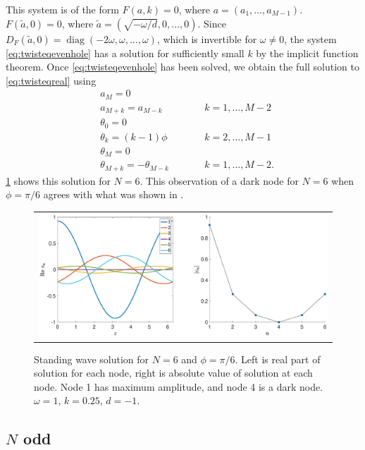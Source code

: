 \documentclass[12pt]{article}
\DeclareMathOperator{\diag}{diag}
\begin{document}
This system is of the form $F(a,k) = 0$, where $a = (a_1, \dots, a_{M-1})$. $F(\tilde{a}, 0) = 0$, where $\tilde{a} = (\sqrt{-\omega/d}, 0, \dots, 0)$. Since $D_F(\tilde{a}, 0) = \diag(-2\omega,\omega, \dots, \omega)$, which is invertible for $\omega \neq 0$, the system \cref{eq:twisteqevenhole} has a solution for sufficiently small $k$ by the implicit function theorem. Once \cref{eq:twisteqevenhole} has been solved, we obtain the full solution to \cref{eq:twisteqreal} using
\begin{align*}
&a_M = 0 \\
&a_{M+k} = a_{M-k} && \qquad k = 1, \dots, M-2 \\
&\theta_0 = 0 \\
&\theta_k = (k-1)\phi && \qquad  k = 2, \dots, M-1 \\
&\theta_M = 0 \\
&\theta_{M+k} = -\theta_{M-k} && \qquad k = 1, \dots, M-2.
\end{align*}
\cref{fig:evenhole6} shows this solution for $N=6$. This observation of a dark node for $N = 6$ when $\phi = \pi/6$ agrees with what was shown in \cite{castro2016}.

\begin{figure}[H]
\begin{center}
\begin{tabular}{c}
\includegraphics[width=15cm]{images/evenhole6.eps}
\end{tabular}
\end{center}
\caption{Standing wave solution for $N = 6$ and $\phi = \pi/6$. Left is real part of solution for each node, right is absolute value of solution at each node. Node 1 has maximum amplitude, and node 4 is a dark node. $\omega = 1$, $k = 0.25$, $d=-1$.}
\label{fig:evenhole6}
\end{figure}

\subsection{\texorpdfstring{$N$}{N} odd}
\end{document}
